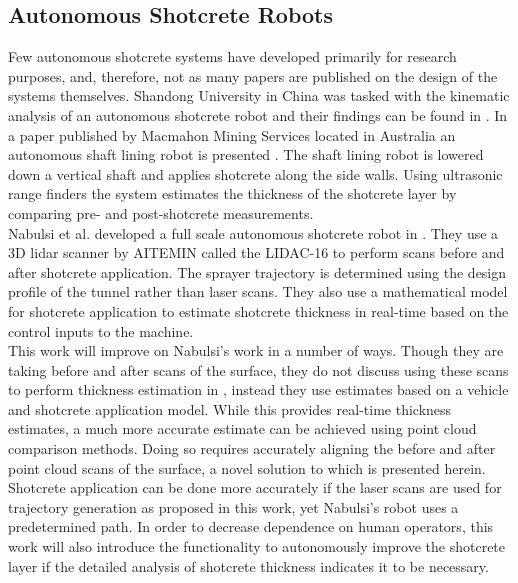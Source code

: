 \subsection{Autonomous Shotcrete Robots}

Few autonomous shotcrete systems have developed primarily for research purposes, and, therefore, not as many papers are published on the design of the systems themselves. Shandong University in China was tasked with the kinematic analysis of an autonomous shotcrete robot and their findings can be found in \cite{kinshot}. In a paper published by Macmahon Mining Services located in Australia an autonomous shaft lining robot is presented \cite{sliner}. The shaft lining robot is lowered down a vertical shaft and applies shotcrete along the side walls. Using ultrasonic range finders the system estimates the thickness of the shotcrete layer by comparing pre- and post-shotcrete measurements.\\

Nabulsi et al. developed a full scale autonomous shotcrete robot in \cite{nabulsi}. They use a 3D \acrshort{lidar} scanner by AITEMIN called the LIDAC-16 to perform scans before and after shotcrete application. The sprayer trajectory is determined using the design profile of the tunnel rather than laser scans. They also use a mathematical model for shotcrete application to estimate shotcrete thickness in real-time based on the control inputs to the machine.\\

This work will improve on Nabulsi's work in a number of ways. Though they are taking before and after scans of the surface, they do not discuss using these scans to perform thickness estimation in \cite{nabulsi}, instead they use estimates based on a vehicle and shotcrete application model. While this provides real-time thickness estimates, a much more accurate estimate can be achieved using point cloud comparison methods. Doing so requires accurately aligning the before and after point cloud scans of the surface, a novel solution to which is presented herein. Shotcrete application can be done more accurately if the laser scans are used for trajectory generation as proposed in this work, yet Nabulsi's robot uses a predetermined path. In order to decrease dependence on human operators, this work will also introduce the functionality to autonomously improve the shotcrete layer if the detailed analysis of shotcrete thickness indicates it to be necessary.\\

